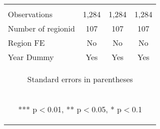 \begin{center}
\begin{tabular}{lccc}
\vspace{4pt} & \begin{footnotesize}\end{footnotesize} & \begin{footnotesize}\end{footnotesize} & \begin{footnotesize}\end{footnotesize} \\
Observations & 1,284 & 1,284 & 1,284 \\
Number of regionid & 107 & 107 & 107 \\
Region FE & No & No & No \\
 Year Dummy & Yes & Yes & Yes \\ \hline
\multicolumn{4}{c}{\begin{footnotesize} Standard errors in parentheses\end{footnotesize}} \\
\multicolumn{4}{c}{\begin{footnotesize} *** p$<$0.01, ** p$<$0.05, * p$<$0.1\end{footnotesize}} \\
\end{tabular}
\end{center}
